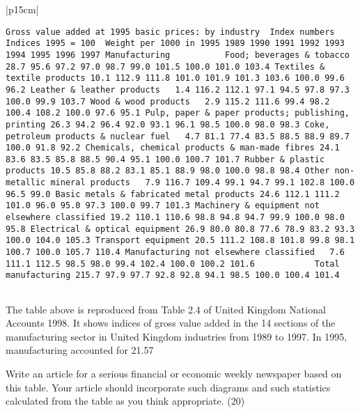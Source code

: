 


\begin{table}[ht!]
     

\centering
     

\begin{tabular}{|p{15cm}|}
     

\hline 


\begin{framed}
\begin{verbatim}
Gross value added at 1995 basic prices: by industry  Index numbers  
Indices 1995 = 100  Weight per 1000 in 1995 1989 1990 1991 1992 1993 1994 1995 1996 1997 Manufacturing           Food; beverages & tobacco 28.7 95.6 97.2 97.0 98.7 99.0 101.5 100.0 101.0 103.4 Textiles & textile products 10.1 112.9 111.8 101.0 101.9 101.3 103.6 100.0 99.6 96.2 Leather & leather products   1.4 116.2 112.1 97.1 94.5 97.8 97.3 100.0 99.9 103.7 Wood & wood products   2.9 115.2 111.6 99.4 98.2 100.4 108.2 100.0 97.6 95.1 Pulp, paper & paper products; publishing, printing 26.3 94.2 96.4 92.0 93.1 96.1 98.5 100.0 98.0 98.3 Coke, petroleum products & nuclear fuel   4.7 81.1 77.4 83.5 88.5 88.9 89.7 100.0 91.8 92.2 Chemicals, chemical products & man-made fibres 24.1 83.6 83.5 85.8 88.5 90.4 95.1 100.0 100.7 101.7 Rubber & plastic products 10.5 85.8 88.2 83.1 85.1 88.9 98.0 100.0 98.8 98.4 Other non-metallic mineral products   7.9 116.7 109.4 99.1 94.7 99.1 102.8 100.0 96.5 99.0 Basic metals & fabricated metal products 24.6 112.1 111.2 101.0 96.0 95.0 97.3 100.0 99.7 101.3 Machinery & equipment not elsewhere classified 19.2 110.1 110.6 98.8 94.8 94.7 99.9 100.0 98.0 95.8 Electrical & optical equipment 26.9 80.0 80.8 77.6 78.9 83.2 93.3 100.0 104.0 105.3 Transport equipment 20.5 111.2 108.8 101.8 99.8 98.1 100.7 100.0 105.7 110.4 Manufacturing not elsewhere classified   7.6 111.1 112.5 98.5 98.0 99.4 102.4 100.0 100.2 101.6            Total manufacturing 215.7 97.9 97.7 92.8 92.8 94.1 98.5 100.0 100.4 101.4 
 
\end{verbatim}
\end{framed}
 
The table above is reproduced from Table 2.4 of United Kingdom National Accounts 1998.  
It shows indices of gross value added in the 14 sections of the manufacturing sector in United Kingdom industries from 1989 to 1997.  In 1995, manufacturing accounted for 21.57%

 
Write an article for a serious financial or economic weekly newspaper based on this table.  Your article should incorporate such diagrams and such statistics calculated from the table as you think appropriate. (20) 
 
\\ \hline


\end{tabular}
    

\end{table}

